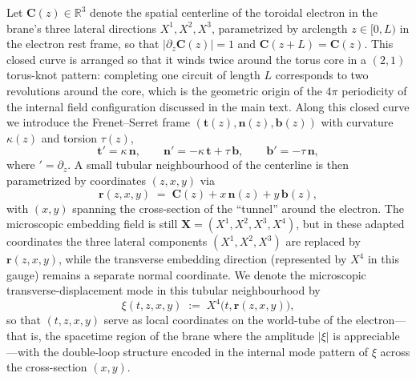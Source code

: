 Let $\mathbf{C}(z)\in\mathbb R^3$ denote the spatial centerline of the
toroidal electron in the brane's three lateral directions
$X^1,X^2,X^3$, parametrized by arclength $z\in[0,L)$ in the electron
rest frame, so that $|\partial_z\mathbf C(z)|=1$ and $\mathbf C(z+L)
=\mathbf C(z)$. This closed curve is arranged so that it winds twice
around the torus core in a $(2,1)$ torus-knot pattern: completing one
circuit of length $L$ corresponds to two revolutions around the core,
which is the geometric origin of the $4\pi$ periodicity of the internal
field configuration discussed in the main text. Along this closed curve
we introduce the Frenet--Serret frame
$(\mathbf t(z),\mathbf n(z),\mathbf b(z))$ with curvature $\kappa(z)$
and torsion $\tau(z)$,
%
\begin{equation}
  \mathbf t'=\kappa\,\mathbf n,\qquad
  \mathbf n'=-\kappa\,\mathbf t+\tau\,\mathbf b,\qquad
  \mathbf b'=-\tau\,\mathbf n,
  \label{eq:frenet-serret}
\end{equation}
%
where $'=\partial_z$. A small tubular neighbourhood of the centerline
is then parametrized by coordinates $(z,x,y)$ via
%
\begin{equation}
  \mathbf r(z,x,y)
  \;=\;
  \mathbf C(z) + x\,\mathbf n(z) + y\,\mathbf b(z),
  \label{eq:tubular-embedding}
\end{equation}
%
with $(x,y)$ spanning the cross-section of the ``tunnel'' around the
electron. The microscopic embedding field is still
$\mathbf X=(X^1,X^2,X^3,X^4)$, but in these adapted coordinates the
three lateral components $(X^1,X^2,X^3)$ are replaced by
$\mathbf r(z,x,y)$, while the transverse embedding direction (represented by $X^4$ in this gauge) remains a
separate normal coordinate. We denote the microscopic transverse-displacement mode in
this tubular neighbourhood by
%
\begin{equation}
  \xi(t,z,x,y) \;:=\; X^4\bigl(t,\mathbf r(z,x,y)\bigr),
  \label{eq:xi-from-X4}
\end{equation}
%
so that $(t,z,x,y)$ serve as local coordinates on the world-tube of
the electron---that is, the spacetime region of the brane where the
amplitude $|\xi|$ is appreciable---with the double-loop structure
encoded in the internal mode pattern of $\xi$ across the cross-section
$(x,y)$.

